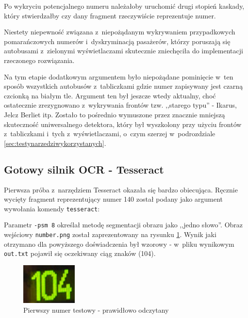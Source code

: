 Po wykryciu potencjalnego numeru należałoby uruchomić drugi stopień
kaskady, który stwierdzałby czy dany fragment rzeczywiście reprezentuje
numer.

Niestety niepewność związana z~niepożądanym wykrywaniem przypadkowych
pomarańczowych numerów i~dyskryminacją pasażerów, którzy
poruszają się autobusami z~zielonymi wyświetlaczami skutecznie
zniechęciła do implementacji rzeczonego rozwiązania.

Na tym etapie dodatkowym argumentem było niepożądane 
pominięcie w~ten sposób
wszystkich autobusów z~tabliczkami gdzie numer zapisywany jest czarną
czcionką na białym tle. Argument ten był jeszcze wtedy aktualny, choć
ostatecznie zrezygnowano z~wykrywania frontów tzw. ,,starego typu'' -
Ikarus, Jelcz Berliet itp. Zostało to pośrednio wymuszone przez 
znacznie mniejszą skuteczność uniwersalnego detektora, który był
wyszkolony przy użyciu frontów z~tabliczkami i~tych z~wyświetlaczami, 
o~czym szerzej w~podrozdziale \ref{sec:testynarzedziwykorzystanych}.

\subsection{Gotowy silnik OCR - Tesseract}

Pierwsza próba z~narzędziem Tesseract okazała się bardzo obiecująca.
Ręcznie wycięty fragment reprezentujący numer 140 został podany 
jako argument wywołania komendy \verb|tesseract|:



Parametr \verb|-psm 8| określał metodę segmentacji obrazu jako ,,jedno
słowo''. Obraz wejściowy \verb|number.png| został zaprezentowany
na rysunku \ref{fig:sample_tesseract_input}. Wynik jaki otrzymano dla 
powyższego doświadczenia
był wzorowy - w~pliku wynikowym \verb|out.txt| pojawił
się oczekiwany ciąg znaków (104).

\begin{figure}[h!]
    \centering
    \includegraphics[width=0.25\textwidth]{img/exp_number_01}
    \caption{Pierwszy numer testowy - prawidłowo odczytany}
    \label{fig:sample_tesseract_input}
\end{figure}

